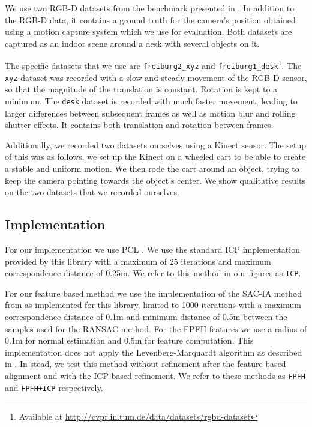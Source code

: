 \documentclass[a4paper]{article}
\begin{document}
We use two RGB-D datasets from the benchmark presented in \cite{sturm11rss-rgbd}. In addition to the RGB-D data, it contains a ground truth for the camera's position obtained using a motion capture system which we use for evaluation. Both datasets are captured as an indoor scene around a desk with several objects on it.

The specific datasets that we use are \texttt{freiburg2\_xyz} and \texttt{freiburg1\_desk}\footnote{Available at \url{http://cvpr.in.tum.de/data/datasets/rgbd-dataset}}. The \texttt{xyz} dataset was recorded with a slow and steady movement of the RGB-D sensor, so that the magnitude of the translation is constant. Rotation is kept to a minimum. The \texttt{desk} dataset is recorded with much faster movement, leading to larger differences between subsequent frames as well as motion blur and rolling shutter effects. It contains both translation and rotation between frames.

Additionally, we recorded two datasets ourselves using a Kinect sensor. The setup of this was as follows, we set up the Kinect on a wheeled cart to be able to create a stable and uniform motion. We then rode the cart around an object, trying to keep the camera pointing towards the object's center. We show qualitative results on the two datasets that we recorded ourselves.

\subsection{Implementation}

For our implementation we use \ac{PCL} \cite{Rusu_ICRA2011_PCL}. We use the standard \ac{ICP} implementation provided by this library with a maximum of 25 iterations and maximum correspondence distance of 0.25m. We refer to this method in our figures as \texttt{ICP}.

 For our feature based method we use the implementation of the \ac{SAC-IA} method from \cite{rusu2009fast} as implemented for this library, limited to 1000 iterations with a maximum correspondence distance of 0.1m and minimum distance of 0.5m between the samples used for the \ac{RANSAC} method. For the \ac{FPFH} features we use a radius of 0.1m for normal estimation and 0.5m for feature computation. This implementation does not apply the Levenberg-Marquardt algorithm as described in \cite{rusu2009fast}. In stead, we test this method without refinement after the feature-based alignment and with the ICP-based refinement. We refer to these methods as \texttt{FPFH} and \texttt{FPFH+ICP} respectively.
 
\end{document}
